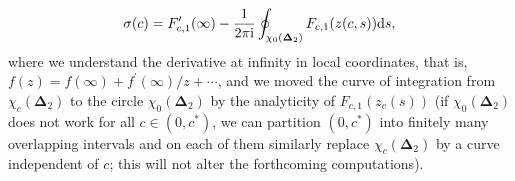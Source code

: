\documentclass[pdftex]{sigma}
\numberwithin{equation}{section}
\newcommand{\ic}{\mathrm{i}}
\begin{document}
\begin{equation}
\label{expression sigma c}
\sigma(c) = F_{c,1}^\prime(\infty) - \frac1{2\pi\ic}\oint_{\chi_0(\boldsymbol\Delta_2)}F_{c,1}(z(c,s)){\rm d}s,
\end{equation}
where we understand the derivative at infinity in local coordinates, that is, $ f(z) = f(\infty) + f^\prime(\infty)/z + \cdots $, and we moved the curve of integration from $ \chi_c(\boldsymbol\Delta_2) $ to the circle $ \chi_0(\boldsymbol\Delta_2) $ by the analyticity of $ F_{c,1}(z_c(s)) $ (if $ \chi_0(\boldsymbol\Delta_2) $ does not work for all $ c\in(0,c^*) $, we can partition $ (0,c^*) $ into finitely many overlapping intervals and on each of them similarly replace $ \chi_c(\boldsymbol\Delta_2) $ by a curve independent of $ c $; this will not alter the forthcoming computations).
\end{document}
